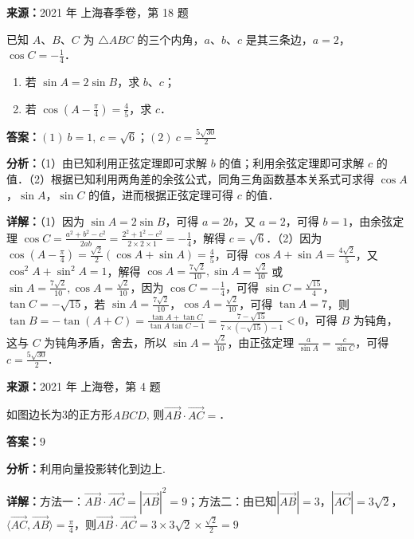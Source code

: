 \begin{question}[points=14]
\textbf{来源：}2021 年 上海春季卷，第 18 题\par
已知 $A$、$B$、$C$ 为 $\triangle ABC$ 的三个内角，$a$、$b$、$c$ 是其三条边，$a=2$，$\cos C=-\frac{1}{4}$．\begin{enumerate}\item[(1)] 若 $\sin A=2\sin B$，求 $b$、$c$；\item[(2)] 若 $\cos(A-\frac{\pi}{4})=\frac{4}{5}$，求 $c$．\end{enumerate}
\begin{solution}
\textbf{答案：}$(1)\ b=1,\ c=\sqrt{6}$；$(2)\ c=\frac{5\sqrt{30}}{2}$

\textbf{分析：}（1）由已知利用正弦定理即可求解 $b$ 的值；利用余弦定理即可求解 $c$ 的值．\newline（2）根据已知利用两角差的余弦公式，同角三角函数基本关系式可求得 $\cos A$，$\sin A$，$\sin C$ 的值，进而根据正弦定理可得 $c$ 的值．

\textbf{详解：}（1）因为 $\sin A=2\sin B$，可得 $a=2b$，又 $a=2$，可得 $b=1$，由余弦定理 $\cos C=\frac{a^2+b^2-c^2}{2ab}=\frac{2^2+1^2-c^2}{2\times 2\times 1}=-\frac{1}{4}$，解得 $c=\sqrt{6}$．\newline（2）因为 $\cos(A-\frac{\pi}{4})=\frac{\sqrt{2}}{2}(\cos A+\sin A)=\frac{4}{5}$，可得 $\cos A+\sin A=\frac{4\sqrt{2}}{5}$，又 $\cos^2 A+\sin^2 A=1$，解得 $\cos A=\frac{7\sqrt{2}}{10},\sin A=\frac{\sqrt{2}}{10}$ 或 $\sin A=\frac{7\sqrt{2}}{10},\cos A=\frac{\sqrt{2}}{10}$，因为 $\cos C=-\frac{1}{4}$，可得 $\sin C=\frac{\sqrt{15}}{4}$，$\tan C=-\sqrt{15}$，若 $\sin A=\frac{7\sqrt{2}}{10}$，$\cos A=\frac{\sqrt{2}}{10}$，可得 $\tan A=7$，则 $\tan B=-\tan(A+C)=\frac{\tan A+\tan C}{\tan A\tan C-1}=\frac{7-\sqrt{15}}{7\times(-\sqrt{15})-1}<0$，可得 $B$ 为钝角，这与 $C$ 为钝角矛盾，舍去，所以 $\sin A=\frac{\sqrt{2}}{10}$，由正弦定理 $\frac{a}{\sin A}=\frac{c}{\sin C}$，可得 $c=\frac{5\sqrt{30}}{2}$．
\end{solution}
\end{question}

\begin{question}[points=4]
\textbf{来源：}2021 年 上海卷，第 4 题\par
如图边长为3的正方形$ABCD$, 则$\overrightarrow{AB}\cdot\overrightarrow{AC}=$．
\fillin[{$9$}]
\begin{solution}
\textbf{答案：}$9$

\textbf{分析：}利用向量投影转化到边上.

\textbf{详解：}方法一：$\overrightarrow{AB}\cdot\overrightarrow{AC}=|\overrightarrow{AB}|^2=9$；方法二：由已知$|\overrightarrow{AB}|=3$，$|\overrightarrow{AC}|=3\sqrt{2}$，$\langle\overrightarrow{AC},\overrightarrow{AB}\rangle=\frac{\pi}{4}$，则$\overrightarrow{AB}\cdot\overrightarrow{AC}=3\times3\sqrt{2}\times\frac{\sqrt{2}}{2}=9$
\end{solution}
\end{question}


